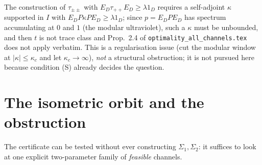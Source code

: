 \documentclass[11pt]{article}
\begin{document}
\begin{verdictgap}
The construction of $\tau_{\pm\pm}$ with $E_D\tau_{++}E_D\ge\lambda 1_D$ requires a
self-adjoint $\kappa$ supported in $I$ with $E_DP\kappa PE_D\ge\lambda 1_D$; since
$p=E_DPE_D$ has spectrum accumulating at $0$ and $1$ (the modular ultraviolet), such a
$\kappa$ must be unbounded, and then $t$ is not trace class and
Prop.~2.4 of \texttt{optimality\_all\_channels.tex} does not apply verbatim.  This is a
regularisation issue (cut the modular window at $|\kappa|\le\kappa_c$ and let
$\kappa_c\to\infty$), \emph{not} a structural obstruction; it is not pursued here
because condition (S) already decides the question.
\end{verdictgap}

\section{The isometric orbit and the obstruction}\label{sec:orbit}

The certificate can be tested without ever constructing $\Sigma_1,\Sigma_2$: it suffices
to look at one explicit two-parameter family of \emph{feasible} channels.
\end{document}
